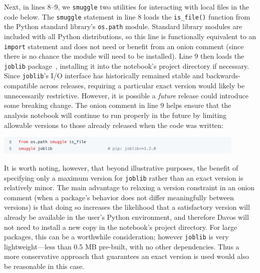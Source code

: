 \documentclass[preprint,12pt,a4paper]{elsarticle}
\begin{document}
Next, in lines 8--9, we \texttt{smuggle} two
utilities for interacting with local files in the code below. The
\texttt{smuggle} statement in line 8 loads the \texttt{is\_file()}
function from the Python standard library's \texttt{os.path}
module. Standard library modules are included with all Python
distributions, so this line is functionally equivalent to an
\texttt{import} statement and does not need or benefit from an onion
comment (since there is no chance the module will need to be installed).
Line 9 then loads the \texttt{joblib} package~\cite{Varo10},
installing it into the notebook's project directory if necessary. Since \texttt{joblib}'s I/O
interface has historically remained stable and backwards-compatible
across releases, requiring a particular exact version
would likely be unnecessarily restrictive. However, it is possible a
\textit{future} release could introduce some breaking change.  The
onion comment in line 9 helps ensure that the analysis notebook will continue
to run properly in the future by limiting allowable versions to those
already released when the code was written:
\begin{center}
\includegraphics[width=0.9\textwidth]{figs/example2}
\end{center}
It is worth noting, however, that beyond illustrative purposes, the benefit of specifying only a maximum version for \texttt{joblib} rather than an exact version is relatively minor.
The main advantage to relaxing a version constraint in an onion comment (when a package's behavior does not differ meaningfully between versions) is that doing so increases the likelihood that a satisfactory version will already be available in the user's Python environment, and therefore Davos will not need to install a new copy in the notebook's project directory.
For large packages, this can be a worthwhile consideration; however \texttt{joblib} is very lightweight---less than 0.5 MB pre-built, with no other dependencies.
Thus a more conservative approach that guarantees an exact version is used would also be reasonable in this case.
\end{document}
